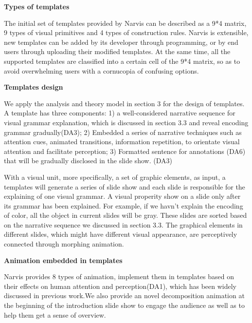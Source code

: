 \textbf{Types of templates}

The initial set of templates provided by Narvis can be described as  a 9*4 matrix, 9 types of visual primitives and 4 types of construction rules. Narvis is extensible, new templates can be added by its developer through programming, or by end users through uploading their modified templates. At the same time, all the supported templates are classified into a certain cell of the 9*4 matrix, so as to avoid overwhelming users with a cornucopia of confusing options.

\textbf{Templates design}

We apply the analysis and theory model in section 3 for the design of templates. A template has three components: 1) a well-considered narrative sequence for visual grammar explanation, which  is discussed in section 3.3 and reveal encoding grammar gradually(DA3); 2) Embedded a series of narrative techniques such as attention cues, animated transitions, information repetition, to orientate visual attention and facilitate perception; 3) Formatted sentence for annotations (DA6) that will be gradually disclosed in the slide show. (DA3)

With a visual unit, more specifically, a set of graphic elements, as input, a templates will generate a series of slide show and each slide is responsible for the explaining of one visual grammar. A visual properity show on a slide only after its grammar has been explained. For example, if we havn't explain the encoding of color, all the object in current slides will be gray. These slides are sorted based on the narrative sequence we discussed in section 3.3. The graphical elements in different slides, which might have different visual appearance, are perceptively connected through morphing animation.

\textbf{Animation embedded in templates }

Narvis provides 8 types of animation, implement them in templates based on their effects on human attention and perception(DA1), which has been widely discussed in previous work.\cite{robertson_effectiveness_2008, waldner_attractive_2014, heer_animated_2007}We also provide an novel decomposition animation at the beginning of the introduction slide show to engage the audience as well as to help them get a sense of overview.

